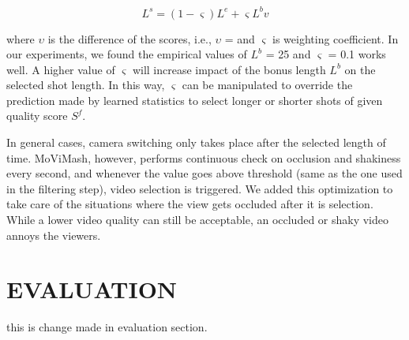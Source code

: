 \documentclass{new}
\begin{document}
\begin{equation}
    L^s = (1 - \varsigma)L^e + \varsigma L^bv
\end{equation}

where $\upsilon$ is the difference of the scores, i.e., $\upsilon$ =
and $\varsigma$ is
weighting coefficient. In our experiments, we found the empirical
values of $L^b$ = 25 and $\varsigma$ = 0.1 works well. A higher value of
 $\varsigma$ will increase impact of the bonus length $L^b$ on the selected shot
length. In this way, $\varsigma$ can be manipulated to override the prediction
made by learned statistics to select longer or shorter shots of given
quality score $S^f$.

In general cases, camera switching only takes place after the selected length of time. MoViMash, however, performs continuous
check on occlusion and shakiness every second, and whenever the
value goes above threshold (same as the one used in the filtering
step), video selection is triggered. We added this optimization to
take care of the situations where the view gets occluded after it is
selection. While a lower video quality can still be acceptable, an
occluded or shaky video annoys the viewers.



\section{EVALUATION}
this is change made in evaluation section.
\end{document}
